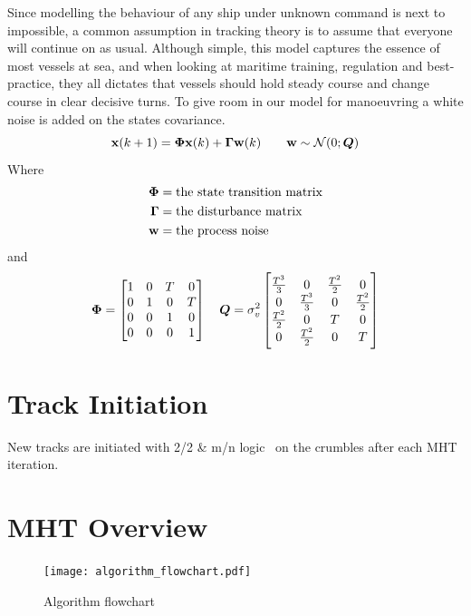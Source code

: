 Since modelling the behaviour of any ship under unknown command is next to impossible, a common assumption in tracking theory is to assume that everyone will continue on as usual. Although simple, this model captures the essence of most vessels at sea, and when looking at maritime training, regulation and best-practice, they all dictates that vessels should hold steady course and change course in clear decisive turns. To give room in our model for manoeuvring a white noise is added on the states covariance. 
\begin{equation}
\boldsymbol{\mathbf{x}}(k+1) = \bm{\Phi} \boldsymbol{\mathbf{x}}(k) + \bm{\Gamma} \boldsymbol{\mathbf{w}}(k) \qquad \boldsymbol{\mathbf{w}} \sim \mathcal{N}(0;\bm{Q})
\label{eq:motion_model}
\end{equation}
Where 
\begin{equation}
\begin{split}
\bm{\Phi} 	&= \text{the state transition matrix} \\
\bm{\Gamma}	&= \text{the disturbance matrix} \\
\boldsymbol{\mathbf{w}}		&= \text{the process noise}
\end{split}
\end{equation}
and 
\begin{equation*}
\bm{\Phi} =	\begin{bmatrix}
1 & 0 & T & 0 \\
0 & 1 & 0 & T \\
0 & 0 & 1 & 0 \\
0 & 0 & 0 & 1 \\
\end{bmatrix}
\quad
\bm{Q}	= \sigma_v^2 \begin{bmatrix}
\frac{T^3}{3} 	& 0 				& \frac{T^2}{2}	& 0 			\\
0 				& \frac{T^3}{3}  	& 0 			& \frac{T^2}{2}	\\
\frac{T^2}{2}	& 0					& T				& 0				\\
0				& \frac{T^2}{2}		& 0				& T				\\
\end{bmatrix}
\end{equation*}



\section{Track Initiation}
New tracks are initiated with 2/2 \& m/n logic~\cite{Vo2015} on the crumbles after each MHT iteration.

\section{MHT Overview}
\begin{figure}[H]
\centering
\texttt{[image: algorithm\_flowchart.pdf]}
\caption{Algorithm flowchart}
\label{fig:algorithm_flow}
\end{figure}

